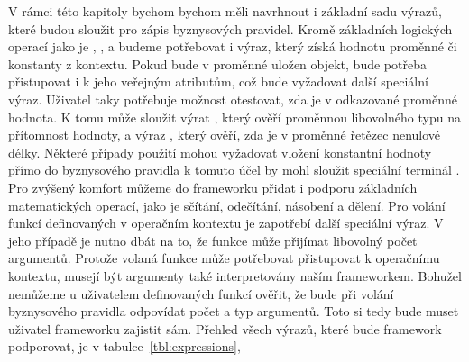 V rámci této kapitoly bychom bychom měli navrhnout i základní sadu výrazů, které budou
sloužit pro zápis byznysových pravidel. Kromě základních logických operací jako je
, ,  a  budeme potřebovat i výraz,
který získá hodnotu proměnné či konstanty z kontextu. Pokud bude v proměnné uložen
objekt, bude potřeba přistupovat i k jeho veřejným atributům, což bude vyžadovat další
speciální výraz. Uživatel taky potřebuje možnost otestovat, zda je v odkazované proměnné
hodnota. K tomu může sloužit výrat , který ověří proměnnou libovolného
typu na přítomnost hodnoty, a výraz , který ověří, zda je v proměnné řetězec
nenulové délky. Některé případy použití mohou vyžadovat vložení konstantní hodnoty přímo do byznysového
pravidla \textendash\xspace k tomuto účel by mohl sloužit speciální terminál .
Pro zvýšený komfort můžeme do frameworku přidat i podporu základních matematických operací,
jako je sčítání, odečítání, násobení a dělení. Pro volání funkcí definovaných
v operačním kontextu je zapotřebí další speciální výraz. V jeho případě je nutno
dbát na to, že funkce může přijímat libovolný počet argumentů. Protože volaná funkce může potřebovat
přistupovat k operačnímu kontextu, musejí být argumenty také interpretovány naším frameworkem.
Bohužel nemůžeme u uživatelem definovaných funkcí ověřit, že bude při volání byznysového pravidla odpovídat
počet a typ argumentů. Toto si tedy bude muset uživatel frameworku zajistit sám.
Přehled všech výrazů, které bude framework podporovat, je v tabulce~\ref{tbl:expressions},

